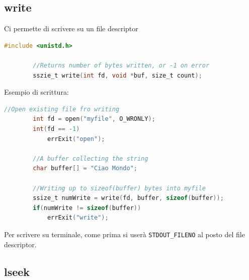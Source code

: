 \documentclass[a4paper, 12pt]{book}
\begin{document}
    \subsection{write}

    Ci permette di scrivere su un file descriptor
    \begin{lstlisting}[language=C]
        #include <unistd.h>

        //Returns number of bytes written, or -1 on error
        sszie_t write(int fd, void *buf, size_t count);
    \end{lstlisting}
    Esempio di scrittura:
    \begin{lstlisting}[language=C]
        //Open existing file fro writing
        int fd = open("myfile", O_WRONLY);
        int(fd == -1)
            errExit("open");

        //A buffer collecting the string
        char buffer[] = "Ciao Mondo";

        //Writing up to sizeof(buffer) bytes into myfile
        ssize_t numWrite = write(fd, buffer, sizeof(buffer));
        if(numWrite != sizeof(buffer))
            errExit("write");
    \end{lstlisting}
    Per scrivere su terminale, come prima si userà \verb|STDOUT_FILENO| al posto del file descriptor.

    \subsection{lseek}
\end{document}
